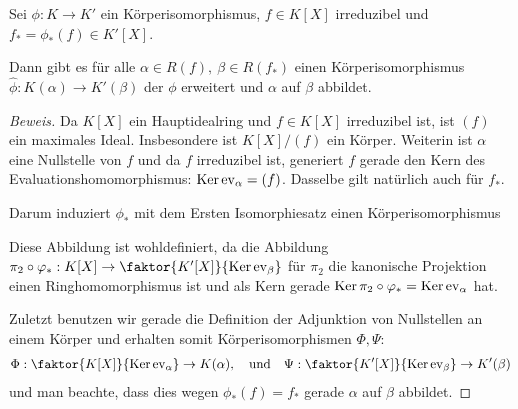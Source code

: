 \begin{lem}[Rotman 3.130]\label{lem:rot3-130}
Sei $\phi: K \to K'$ ein Körperisomorphismus, $f \in K[X]$ irreduzibel und $f_\ast = \phi_\ast(f)\in K'[X]$.

Dann gibt es für alle $\alpha \in R(f),\ \beta \in R(f_\ast)$ einen Körperisomorphismus $\widehat{\phi}: K(\alpha) \to K'(\beta)$ der $\phi$ erweitert und $\alpha$ auf $\beta$ abbildet.
\end{lem}
\begin{proof}[Beweis]
Da $K[X]$ ein Hauptidealring und $f \in K[X]$ irreduzibel ist, ist $(f)$ ein maximales Ideal.
Insbesondere ist $K[X]/(f)$ ein Körper.
Weiterin ist $\alpha$ eine Nullstelle von $f$ und da $f$ irreduzibel ist, generiert $f$ gerade den Kern des Evaluationshomomorphismus: $\operatorname{Ker} \operatorname{ev}_\alpha = (f)$.
Dasselbe gilt natürlich auch für $f_\ast$.

Darum induziert $\phi_\ast$ mit dem Ersten Isomorphiesatz einen Körperisomorphismus
\begin{center}
\end{center}
Diese Abbildung ist wohldefiniert, da die Abbildung $\pi_2 \circ \phi_\ast :K[X] \to \faktor{K'[X]}{\Ker \ev_\beta}$ für $\pi_2$ die kanonische Projektion einen Ringhomomorphismus ist und als Kern gerade $\operatorname{Ker} \pi_2 \circ \varphi_\ast = \operatorname{Ker} \operatorname{ev}_\alpha$ hat.

Zuletzt benutzen wir gerade die Definition der Adjunktion von Nullstellen an einem Körper und erhalten somit Körperisomorphismen  $\Phi,\Psi$:
\begin{align*}
    \Phi: \faktor{K[X]}{\Ker \ev_\alpha} \to K(\alpha), \quad \text{und} \quad \Psi: \faktor{K'[X]}{\Ker \ev_\beta} \to K'(\beta)
\end{align*}
und man beachte, dass dies wegen $\phi_\ast(f) = f_\ast$ gerade $\alpha$ auf $\beta$ abbildet.


\end{proof}
